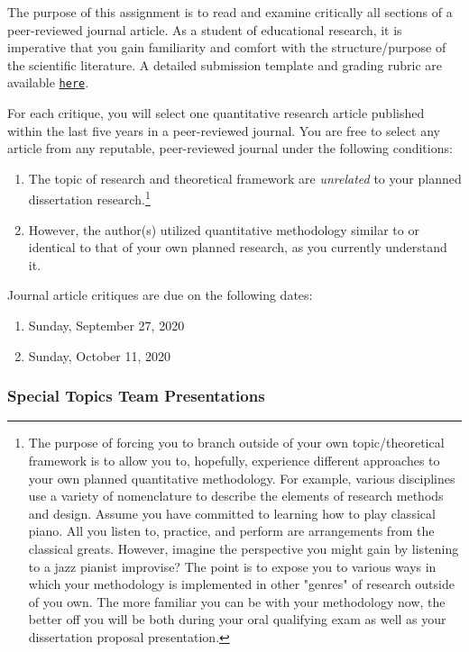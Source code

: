\documentclass[
]{article}
\providecommand{\tightlist}{%
  \setlength{\itemsep}{0pt}\setlength{\parskip}{0pt}}
\begin{document}
The purpose of this assignment is to read and examine critically all
sections of a peer-reviewed journal article. As a student of educational
research, it is imperative that you gain familiarity and comfort with
the structure/purpose of the scientific literature. A detailed
submission template and grading rubric are available
\texttt{\href{https://bit.ly/31bLEDx}{here}}.

For each critique, you will select one quantitative research article
published within the last five years in a peer-reviewed journal. You are
free to select any article from any reputable, peer-reviewed journal
under the following conditions:

\begin{enumerate}
\def\labelenumi{\arabic{enumi}.}
\tightlist
\item
  The topic of research and theoretical framework are \emph{unrelated}
  to your planned dissertation
  research.\footnote{The purpose of forcing you to branch outside of your own topic/theoretical framework is to allow you to, hopefully, experience different approaches to your own planned quantitative methodology. For example, various disciplines use a variety of nomenclature to describe the elements of research methods and design. Assume you have committed to learning how to play classical piano. All you listen to, practice, and perform are arrangements from the classical greats. However, imagine the perspective you might gain by listening to a jazz pianist improvise? The point is to expose you to various ways in which your methodology is implemented in other "genres" of research outside of you own. The more familiar you can be with your methodology now, the better off you will be both during your oral qualifying exam as well as your dissertation proposal presentation.}
\item
  However, the author(s) utilized quantitative methodology similar to or
  identical to that of your own planned research, as you currently
  understand it.
\end{enumerate}

Journal article critiques are due on the following dates:

\begin{enumerate}
\def\labelenumi{\arabic{enumi}.}
\tightlist
\item
  Sunday, September 27, 2020
\item
  Sunday, October 11, 2020
\end{enumerate}

\subsubsection{Special Topics Team Presentations}
\end{document}
